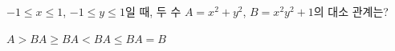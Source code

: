 $-1\le x\le 1$, $-1\le y\le 1$일 때, 두 수 $A=x^2+y^2$, $B=x^2y^2+1$의 대소 관계는?
\begin{choices32}{$A>B$}{$A\ge B$}{$A<B$}{$A\le B$}{$A=B$}\end{choices32}

